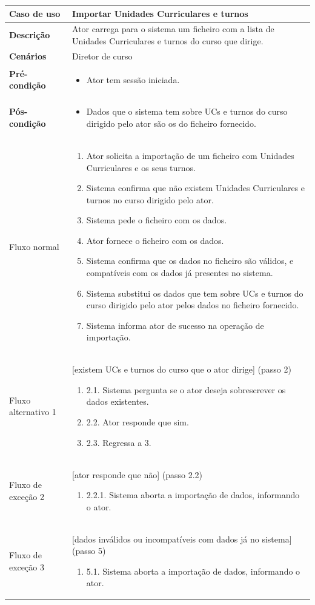 \documentclass[12pt, a4paper]{article}
\newenvironment{condition}{
    \begin{itemize}[wide=0pt]
        \vspace{-0.2cm}
}{
        \vspace{-0.5cm}
    \end{itemize}
}
\newcommand\flow[1]{
    Fluxo normal &
    \singlespacing
    \begin{enumerate}[wide=0pt]
        #1
        \vspace{-0.3cm}
    \end{enumerate} \\ \hline
}
\newcommand\otherflow[3]{
    #1 &
    #2
    \singlespacing
    \begin{enumerate}[wide=0pt]
        #3
        \vspace{-0.3cm}
    \end{enumerate} \\ \hline
}
\newenvironment{usecase}[5]{
    \begin{table}[H]
        \centering
        \begin{tabular}{|>{\centering\arraybackslash\bf}m{3cm}|m{13cm}|}
            \hline
            Caso de uso & \textbf{#1} \\

            \hline
            Descrição & #2 \\

            \hline
            Cenários & #3 \\

            \hline
            Pré-condição &
            \begin{condition}
                #4
            \end{condition} \\

            \hline
            Pós-condição &
            \begin{condition}
                #5
            \end{condition} \\

            \hline
}{
    \end{tabular}
\end{table}
}
\begin{document}
\begin{usecase}
    {Importar Unidades Curriculares e turnos}
    {
        Ator carrega para o sistema um ficheiro com a lista de Unidades Curriculares e turnos do
        curso que dirige.
    }
    {Diretor de curso}
    {\item Ator tem sessão iniciada.}
    {
        \item Dados que o sistema tem sobre UCs e turnos do curso dirigido pelo ator são os do
            ficheiro fornecido.
    }

    \flow{
        \item Ator solicita a importação de um ficheiro com Unidades Curriculares e os seus turnos.
        \item Sistema confirma que não existem Unidades Curriculares e turnos no curso dirigido pelo
            ator.
        \item Sistema pede o ficheiro com os dados.
        \item Ator fornece o ficheiro com os dados.
        \item Sistema confirma que os dados no ficheiro são válidos, e compatíveis com os dados já
            presentes no sistema.
        \item Sistema substitui os dados que tem sobre UCs e turnos do curso dirigido pelo ator
            pelos dados no ficheiro fornecido.
        \item Sistema informa ator de sucesso na operação de importação.
    }

    \otherflow{Fluxo alternativo 1}{[existem UCs e turnos do curso que o ator dirige] (passo 2)}{
        \item[2.1.] Sistema pergunta se o ator deseja sobrescrever os dados existentes.
        \item[2.2.] Ator responde que sim.
        \item[2.3.] Regressa a 3.
    }

    \otherflow{Fluxo de exceção 2}{[ator responde que não] (passo 2.2)}{
        \item[2.2.1.] Sistema aborta a importação de dados, informando o ator.
    }

    \otherflow{Fluxo de exceção 3}
        {[dados inválidos ou incompatíveis com dados já no sistema] (passo 5)}{

        \item[5.1.] Sistema aborta a importação de dados, informando o ator.
    }
\end{usecase}
\end{document}
